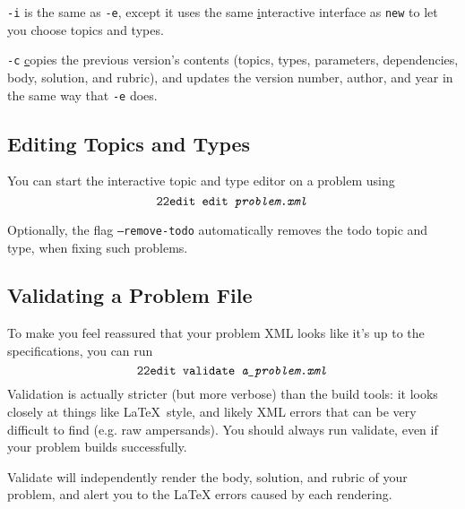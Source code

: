     \texttt{-i} is the same as \texttt{-e}, except it uses the same 
    \underline{i}nteractive interface as \pytool\texttt{new} to let you 
    choose topics and types.
    
    \texttt{-c} \underline{c}opies the previous version's contents 
    (topics, types, parameters, dependencies, body, solution, and rubric),
    and updates the version number, author, and year in the same way that 
    \texttt{-e} does.
    
  \subsection{Editing Topics and Types}
    You can start the interactive topic and type editor on a problem using 
    \[\texttt{22edit }\texttt{edit \textit{problem.xml}}\]
    
    Optionally, the flag \texttt{--remove-todo} automatically removes the 
    todo topic and type, when fixing such problems.
    
  \subsection{Validating a Problem File}
    To make you feel reassured that your problem XML looks like it's up to 
    the specifications, you can run 
    \[\texttt{22edit }\texttt{validate \textit{a\_problem.xml}}\] 
    Validation is actually stricter (but more verbose) than the build 
    tools: it looks closely at things like \LaTeX\ style, and likely XML 
    errors that can be very difficult to find (e.g. raw ampersands). 
    You should always run validate, even if your problem builds successfully.
    
    Validate will independently render the body, solution, and rubric of your
    problem, and alert you to the LaTeX errors caused by each rendering.
    